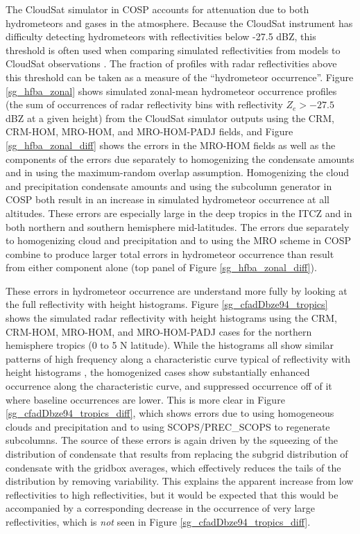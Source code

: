 The CloudSat simulator in COSP accounts for attenuation due to both hydrometeors and gases in the atmosphere. Because the CloudSat instrument has difficulty detecting hydrometeors with reflectivities below -27.5 dBZ, this threshold is often used when comparing simulated reflectivities from models to CloudSat observations \citep{marchand_et_al_2009}. The fraction of profiles with radar reflectivities above this threshold can be taken as a measure of the ``hydrometeor occurrence''. Figure \ref{sg_hfba_zonal} shows simulated zonal-mean hydrometeor occurrence profiles (the sum of occurrences of radar reflectivity bins with reflectivity  $Z_e > -27.5$ dBZ at a given height) from the CloudSat simulator outputs using the CRM, CRM-HOM, MRO-HOM, and MRO-HOM-PADJ fields, and Figure \ref{sg_hfba_zonal_diff} shows the errors in the MRO-HOM fields as well as the components of the errors due separately to homogenizing the condensate amounts and in using the maximum-random overlap assumption.  Homogenizing the cloud and precipitation condensate amounts and using the subcolumn generator in COSP both result in an increase in simulated hydrometeor occurrence at all altitudes. These errors are especially large in the deep tropics in the ITCZ and in both northern and southern hemisphere mid-latitudes. The errors due separately to homogenizing cloud and precipitation and to using the MRO scheme in COSP combine to produce larger total errors in hydrometeor occurrence than result from either component alone (top panel of Figure \ref{sg_hfba_zonal_diff}). 

These errors in hydrometeor occurrence are understand more fully by looking at the full reflectivity with height histograms. Figure \ref{sg_cfadDbze94_tropics} shows the simulated radar reflectivity with height histograms using the CRM, CRM-HOM, MRO-HOM, and MRO-HOM-PADJ cases for the northern hemisphere tropics (0 to 5 N latitude). While the histograms all show similar patterns of high frequency along a characteristic curve typical of reflectivity with height histograms \citep[e.g.,][]{marchand_et_al_2009}, the homogenized cases show substantially enhanced occurrence along the characteristic curve, and suppressed occurrence off of it where baseline occurrences are lower. This is more clear in Figure \ref{sg_cfadDbze94_tropics_diff}, which shows errors due to using homogeneous clouds and precipitation and to using SCOPS/PREC\_SCOPS to regenerate subcolumns. The source of these errors is again driven by the squeezing of the distribution of condensate that results from replacing the subgrid distribution of condensate with the gridbox averages, which effectively reduces the tails of the distribution by removing variability. This explains the apparent increase from low reflectivities to high reflectivities, but it would be expected that this would be accompanied by a corresponding decrease in the occurrence of very large reflectivities, which is \emph{not} seen in Figure \ref{sg_cfadDbze94_tropics_diff}. 


